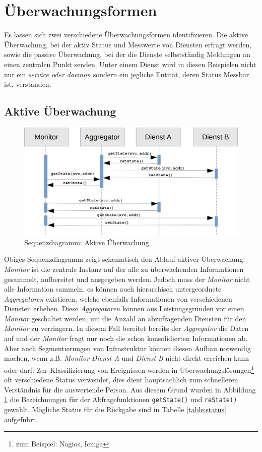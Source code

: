 \section{Überwachungsformen}

Es lassen sich zwei verschiedene Überwachungsformen identifizieren. Die aktive 
Überwachung, bei der aktiv Status und Messwerte von Diensten erfragt werden, sowie die 
passive Überwachung, bei der die Dienste selbstständig Meldungen an einen zentralen Punkt
senden. Unter einem Dienst wird in diesen Beispielen nicht nur ein \textit{service oder 
daemon} sondern ein jegliche Entität, deren Status Messbar ist, verstanden.

\subsection{Aktive Überwachung}
\begin{figure}[htbp]
    \caption{Sequenzdiagramm: Aktive Überwachung}
    \label{aktiv}\vspace{0.2cm}
    \centering
    \includegraphics[scale=0.36]{img/sequence_uml_active_trans}

\end{figure}

Obiges Sequenzdiagramm zeigt schematisch den Ablauf aktiver Überwachung. \emph{Monitor} 
ist die zentrale Instanz auf der alle zu überwachenden Informationen gesammelt, 
aufbereitet und ausgegeben werden. Jedoch muss der \emph{Monitor} nicht alle Information
sammeln, es können auch hierarchisch untergeordnete \emph{Aggregatoren} existieren, 
welche ebenfalls Informationen von verschiedenen Diensten erheben. Diese 
\emph{Aggregatoren} können aus Leistungsgründen vor einen \emph{Monitor} geschaltet 
werden, um die Anzahl an abzufragenden Diensten für den \emph{Monitor} zu verringern. In 
diesem Fall bereitet bereits der \emph{Aggregator} die Daten auf und der \emph{Monitor} 
fragt nur noch die schon konsolidierten Informationen ab. Aber auch Segmentierungen von 
Infrastruktur können diesen Aufbau notwendig machen, wenn z.B. \emph{Monitor} 
\emph{Dienst A} und \emph{Dienst B} nicht direkt erreichen kann oder darf. Zur 
Klassifizierung von Ereignissen werden in Überwachungslösungen\footnote{zum Beispiel: 
Nagios, Icinga} oft verschiedene Status verwendet, dies dient hauptsächlich zum 
schnelleren Verständnis für die auswertende Person. Aus diesem Grund wurden in 
Abbildung \ref{aktiv} die Bezeichnungen für der Abfragefunktionen \texttt{getState()} und 
\texttt{reState()} gewählt. Mögliche Status für die Rückgabe sind in Tabelle 
\ref{table:status} aufgeführt.

